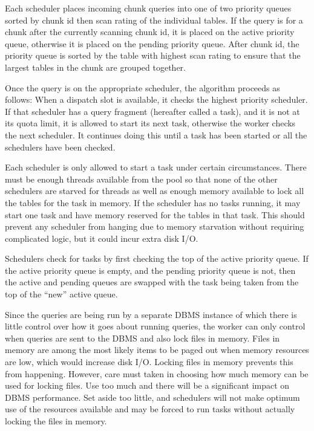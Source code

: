 \documentclass[DM,toc]{lsstdoc}
\begin{document}
Each scheduler places incoming chunk queries into one of two priority
queues sorted by chunk id then scan rating of the individual tables. If
the query is for a chunk after the currently scanning chunk id, it is
placed on the active priority queue, otherwise it is placed on the
pending priority queue. After chunk id, the priority queue is sorted by
the table with highest scan rating to ensure that the largest tables in
the chunk are grouped together.

Once the query is on the appropriate scheduler, the algorithm proceeds
as follows: When a dispatch slot is available, it checks the highest
priority scheduler. If that scheduler has a query fragment (hereafter
called a task), and it is not at its quota limit, it is allowed to start
its next task, otherwise the worker checks the next scheduler. It
continues doing this until a task has been started or all the schedulers
have been checked.

Each scheduler is only allowed to start a task under certain circumstances.
There must be enough threads available from the pool so that none of the other
schedulers are starved for threads as well as enough memory available to lock
all the tables for the task in memory. If the scheduler has no tasks running,
it may start one task and have memory reserved for the tables in that task.
This should prevent any scheduler from hanging due to memory starvation
without requiring complicated logic, but it could incur extra disk I/O.

Schedulers check for tasks by first checking the top of the active
priority queue. If the active priority queue is empty, and the pending
priority queue is not, then the active and pending queues are swapped
with the task being taken from the top of the ``new'' active queue.

Since the queries are being run by a separate DBMS instance of which
there is little control over how it goes about running queries, the worker
can only control when queries are sent to the DBMS and also lock files in
memory. Files in memory are among the most likely items to be paged out
when memory resources are low, which would increase disk I/O. Locking
files in memory prevents this from happening. However, care must taken
in choosing how much memory can be used for locking files. Use too much
and there will be a significant impact on DBMS performance. Set aside
too little, and schedulers will not make optimum use of the resources
available and may be forced to run tasks without actually locking the
files in memory.
\end{document}

